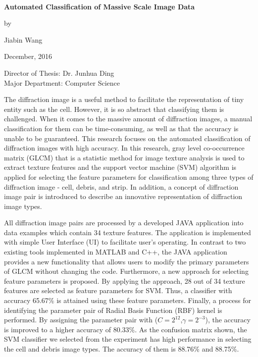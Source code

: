 
\hbox{\ }

\renewcommand{\baselinestretch}{2}
\small \normalsize
\begin{center}
\textbf{Automated Classification of Massive Scale Image Data}
\end{center}
\begin{center}
by
\end{center}
\begin{center}
Jiabin Wang
\end{center}
\begin{center}
December, 2016
\end{center}
Director of Thesis:  Dr. Junhua Ding\\
Major Department:  Computer Science\par

\large \normalsize

The diffraction image is a useful method to facilitate the representation of tiny entity such as the cell. However, it is so abstract that classifying them is challenged. When it comes to the massive amount of diffraction images, a manual classification for them can be time-consuming, as well as that the accuracy is unable to be guaranteed. This research focuses on the automated classification of diffraction images with high accuracy. In this research, gray level co-occurrence matrix (GLCM) that is a statistic method for image texture analysis is used to extract texture features and the support vector machine (SVM) algorithm is applied for selecting the feature parameters for classification among three types of diffraction image - cell, debris, and strip. In addition, a concept of diffraction image pair is introduced to describe an innovative representation of diffraction image types. \par
All diffraction image pairs are processed by a developed JAVA application into data examples which contain 34 texture features. The application is implemented with simple User Interface (UI) to facilitate user's operating. In contrast to two existing tools implemented in MATLAB and C++, the JAVA application provides a new functionality that allows users to modify the primary parameters of GLCM without changing the code. Furthermore, a new approach for selecting feature parameters is proposed. By applying the approach, 28 out of 34 texture features are selected as feature parameters for SVM. Thus, a classifier with accuracy 65.67\% is attained using these feature parameters. Finally, a process for identifying the parameter pair of Radial Basis Function (RBF) kernel is performed. By assigning the parameter pair with ($C = 2^{12}$,$\gamma = 2^{-3}$), the accuracy is improved to a higher accuracy of 80.33\%. As the confusion matrix shown, the SVM classifier we selected from the experiment has high performance in selecting the cell and debris image types. The accuracy of them is 88.76\% and 88.75\%.   
\newpage
\thispagestyle{empty}
\mbox{}
